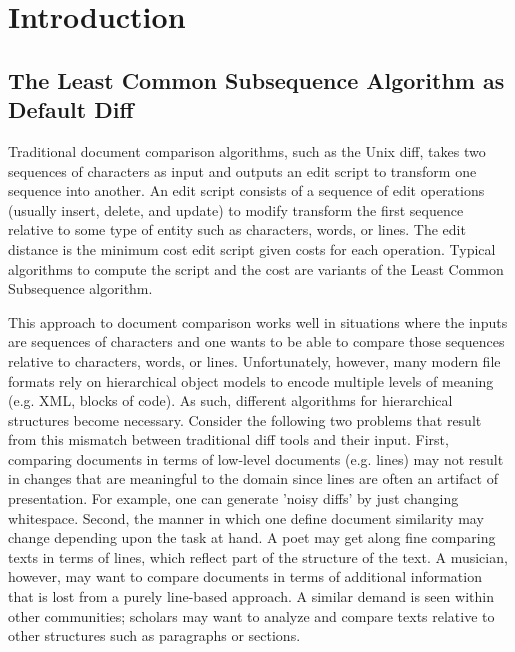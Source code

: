 \documentclass{article}
\title{\papertitle}
\begin{document}
%
\capstartfalse
\maketitle
\capstarttrue
%
\begin{abstract}
We describe an initial approach to hierarchic diff for collaborative music document editing of tree-based music representations, using Zhang and Shasha's tree edit distance
algorithm as implemented within the XUDiff tool.  The edit distance
between two trees is the minimum number of edit operations necessary
to transform one tree into another.  We consider common operations on the score tree -- deleting, changing, and appending tree nodes -- to derive a minimal edit sequence, known as an edit script.
\end{abstract}
%

\section{Introduction}\label{sec:introduction}
\subsection{The Least Common Subsequence Algorithm as Default Diff}
Traditional document comparison algorithms, such as the Unix diff,
takes two sequences of characters as input and outputs an edit script
to transform one sequence into another.  An edit script consists of a
sequence of edit operations (usually insert, delete, and update) to
modify transform the first sequence relative to some type of entity
such as characters, words, or lines.  The edit distance is the minimum
cost edit script given costs for each operation.  Typical algorithms
to compute the script and the cost are variants of the Least Common
Subsequence algorithm.  


This approach to document comparison works well in situations where
the inputs are sequences of characters and one wants to be
able to compare those sequences relative to characters, words, or
lines.  Unfortunately, however, many modern file formats rely on
hierarchical object models to encode multiple levels of meaning
(e.g. XML, blocks of code).  As such, different algorithms for
hierarchical structures become necessary.  Consider the following two
problems that result from this mismatch between traditional diff tools
and their input.  First, comparing documents in terms of low-level
documents (e.g. lines) may not result in changes that are meaningful
to the domain since lines are often an artifact of presentation.  For
example, one can generate 'noisy diffs' by just changing whitespace.
Second, the manner in which one define document similarity may change
depending upon the task at hand.  A poet may get along fine comparing
texts in terms of lines, which reflect part of the structure of the
text.  A musician, however, may want to compare documents in terms of
additional information that is lost from a purely line-based
approach.  A similar demand is seen within other communities; scholars
may want to analyze and compare texts relative to other structures
such as paragraphs or sections.
\end{document}
